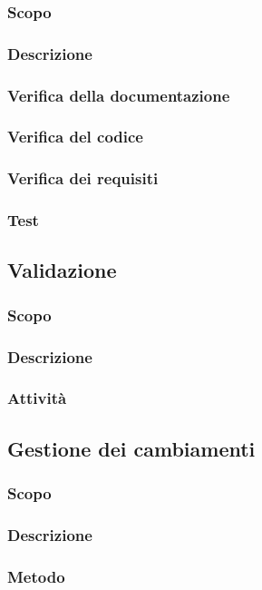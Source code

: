 \subsubsection{Scopo}
\subsubsection{Descrizione}
\subsubsection{Verifica della documentazione}
\subsubsection{Verifica del codice}
\subsubsection{Verifica dei requisiti}
\subsubsection{Test}

\subsection{Validazione}
\subsubsection{Scopo}
\subsubsection{Descrizione}
\subsubsection{Attività}

\subsection{Gestione dei cambiamenti}
\subsubsection{Scopo}
\subsubsection{Descrizione}
\subsubsection{Metodo}
